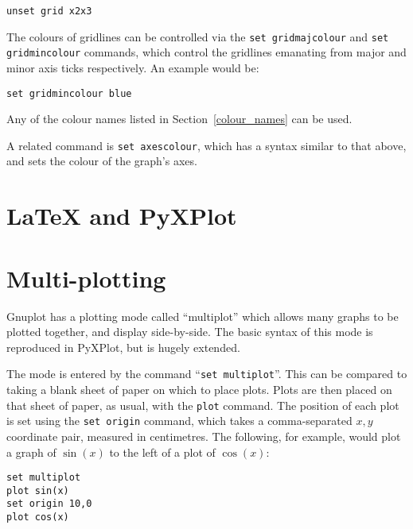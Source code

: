 \begin{verbatim}
unset grid x2x3
\end{verbatim}

The colours of gridlines can be controlled via the \texttt{set
gridmajcolour} and \texttt{set gridmincolour}
commands, which control the gridlines emanating from major and minor axis ticks
respectively. An example would be:

\begin{verbatim}
set gridmincolour blue
\end{verbatim}

\noindent Any of the colour names listed in Section~\ref{colour_names} can be
used.

A related command is \texttt{set
axescolour}, which has a syntax similar
to that above, and sets the colour of the graph's axes.
\label{set_colours}

\section{LaTeX and PyXPlot}

\section{Multi-plotting}
\label{multiplot}

Gnuplot has a plotting mode called ``multiplot'' which allows many graphs to be
plotted together, and display side-by-side. The basic syntax of this mode is
reproduced in PyXPlot, but is hugely extended.

The mode is entered by the command ``\texttt{set multiplot}''. This can be compared
to taking a blank sheet of paper on which to place plots. Plots are then placed
on that sheet of paper, as usual, with the \texttt{plot} command. The position
of each plot is set using the \texttt{set origin} command, which takes a
comma-separated $x,y$ coordinate pair, measured in centimetres. The following,
for example, would plot a graph of $\sin(x)$ to the left of a plot of
$\cos(x)$:

\begin{verbatim} 
set multiplot
plot sin(x)
set origin 10,0
plot cos(x)
\end{verbatim}

